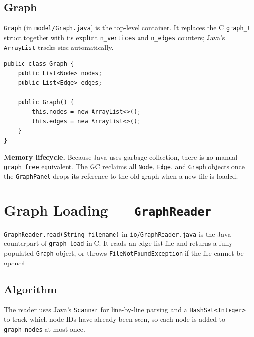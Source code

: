 \documentclass[12pt,a4paper]{article}
\begin{document}
\subsection{Graph}

\texttt{Graph} (in \texttt{model/Graph.java}) is the top-level container.
It replaces the C \texttt{graph\_t} struct together with its explicit
\texttt{n\_vertices} and \texttt{n\_edges} counters; Java's
\texttt{ArrayList} tracks size automatically.

\begin{lstlisting}[caption={Graph class}]
public class Graph {
    public List<Node> nodes;
    public List<Edge> edges;

    public Graph() {
        this.nodes = new ArrayList<>();
        this.edges = new ArrayList<>();
    }
}
\end{lstlisting}

\textbf{Memory lifecycle.} Because Java uses garbage collection, there is
no manual \texttt{graph\_free} equivalent. The GC reclaims all
\texttt{Node}, \texttt{Edge}, and \texttt{Graph} objects once the
\texttt{GraphPanel} drops its reference to the old graph when a new file
is loaded.

\section{Graph Loading — \texttt{GraphReader}}

\texttt{GraphReader.read(String filename)} in \texttt{io/GraphReader.java}
is the Java counterpart of \texttt{graph\_load} in C. It reads an
edge-list file and returns a fully populated \texttt{Graph} object, or
throws \texttt{FileNotFoundException} if the file cannot be opened.

\subsection{Algorithm}

The reader uses Java's \texttt{Scanner} for line-by-line parsing and a
\texttt{HashSet<Integer>} to track which node IDs have already been seen,
so each node is added to \texttt{graph.nodes} at most once.
\end{document}
